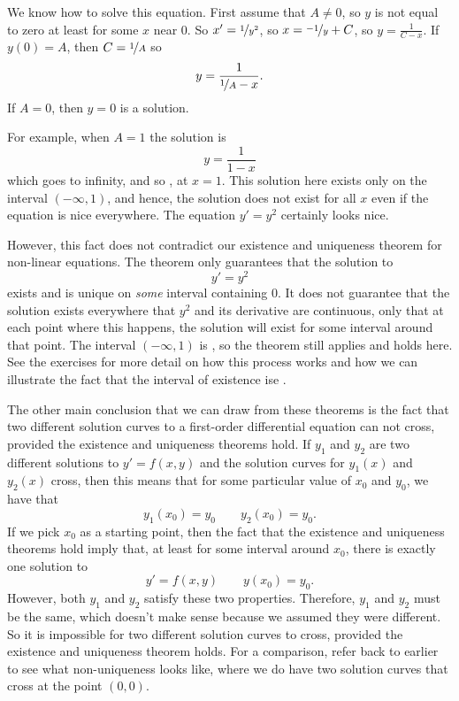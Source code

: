 \begin{exampleSol}
We know how to solve this equation.  First assume that $A \not= 0$,
so $y$ is not equal to zero at least for some $x$ near 0.  So
$x' = \nicefrac{1}{y^2}$, so
$x = \nicefrac{-1}{y} + C$, so $y = \frac{1}{C-x}$.  If $y(0) = A$, then
$C = \nicefrac{1}{A}$ so
\begin{equation*}
y = \frac{1}{\nicefrac{1}{A} - x} .
\end{equation*}
If $A=0$, then $y=0$ is a solution.

For example, when $A=1$
the solution is \begin{equation*}
y = \frac{1}{1-x}
\end{equation*}
which goes to infinity, and so , at $x=1$. This solution here exists only on the interval $(-\infty, 1)$, and hence, the solution does not exist
for all $x$ even if the equation is nice everywhere.  The equation
$y' = y^2$ certainly
looks nice. 

However, this fact does not contradict our existence and uniqueness theorem for non-linear equations. The theorem only guarantees that the solution to \begin{equation*}
y' = y^2
\end{equation*}
exists and is unique on \emph{some} interval containing 0. It does not guarantee that the solution exists everywhere that $y^2$ and its derivative are continuous, only that at each point where this happens, the solution will exist for some interval around that point. The interval $(-\infty, 1)$ is , so the theorem still applies and holds here. See the exercises for more detail on how this process works and how we can illustrate the fact that the interval of existence ise . 
\end{exampleSol}

The other main conclusion that we can draw from these theorems is the fact that two different solution curves to a first-order differential equation can not cross, provided the existence and uniqueness theorems hold. If $y_1$ and $y_2$ are two different solutions to $y' = f(x,y)$ and the solution curves for $y_1(x)$ and $y_2(x)$ cross, then this means that for some particular value of $x_0$ and $y_0$, we have that
\begin{equation*}
y_1(x_0) = y_0 \qquad y_2(x_0) = y_0.
\end{equation*}
If we pick $x_0$ as a starting point, then the fact that the existence and uniqueness theorems hold imply that, at least for some interval around $x_0$, there is exactly one solution to 
\begin{equation*}
y' = f(x,y) \qquad y(x_0) = y_0.
\end{equation*} 
However, both $y_1$ and $y_2$ satisfy these two properties. Therefore, $y_1$ and $y_2$ must be the same, which doesn't make sense because we assumed they were different. So it is impossible for two different solution curves to cross, provided the existence and uniqueness theorem holds. For a comparison, refer back to  earlier to see what non-uniqueness looks like, where we do have two solution curves that cross at the point $(0,0)$.

